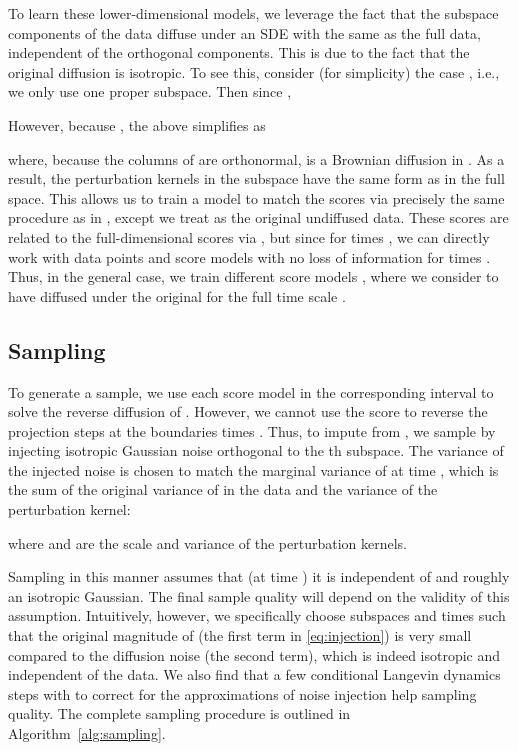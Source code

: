 \documentclass{article}
\begin{document}
To learn these lower-dimensional models, we leverage the fact that the subspace components  of the data diffuse under an SDE with the same  as the full data, independent of the orthogonal components. This is due to the fact that the original diffusion is isotropic. To see this, consider (for simplicity) the case , i.e., we only use one proper subspace. Then since ,


However, because , the above simplifies as

where, because the columns of  are orthonormal,  is a Brownian diffusion in . As a result, the perturbation kernels  in the subspace have the same form as in the full space. This allows us to train a model to match the scores  via precisely the same procedure as in \cite{song2021score}, except we treat  as the original undiffused data. These scores are related to the full-dimensional scores  via , but since  for times , we can directly work with data points  and score models  with no loss of information for times . Thus, in the general case, we train  different score models , where we consider  to have diffused under the original  for the full time scale .

\subsection{Sampling} \label{sec:sampling}

To generate a sample, we use each score model  in the corresponding interval  to solve the reverse diffusion of . However, we cannot use the score to reverse the projection steps at the boundaries times . Thus, to impute  from , we sample  by injecting isotropic Gaussian noise orthogonal to the th subspace. The variance  of the injected noise is chosen to match the marginal variance of  at time , which is the sum of the original variance of  in the data and the variance of the perturbation kernel:

where  and  are the scale and variance of the perturbation kernels.

Sampling  in this manner assumes that (at time ) it is independent of  and roughly an isotropic Gaussian. The final sample quality will depend on the validity of this assumption. Intuitively, however, we specifically choose subspaces and times such that the original magnitude of  (the first term in \eqref{eq:injection}) is very small compared to the diffusion noise (the second term), which is indeed isotropic and independent of the data. We also find that a few conditional Langevin dynamics steps with  to correct for the approximations of noise injection help sampling quality. The complete sampling procedure is outlined in Algorithm~\ref{alg:sampling}.
\end{document}
